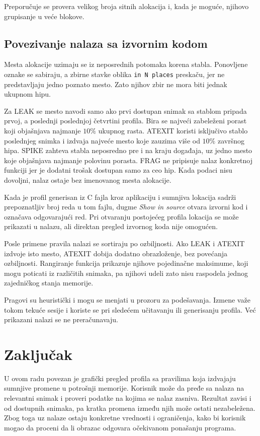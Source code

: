 \documentclass[a4paper,10pt]{article}
\begin{document}
Preporučuje se provera velikog broja sitnih alokacija i, kada je moguće,
njihovo grupisanje u veće blokove.

\subsection{Povezivanje nalaza sa izvornim kodom}

Mesta alokacije uzimaju se iz neposrednih potomaka korena stabla. Ponovljene
oznake se sabiraju, a zbirne stavke oblika \texttt{in N places} preskaču, jer ne
predstavljaju jedno poznato mesto. Zato njihov zbir ne mora biti jednak ukupnom
hipu.

Za LEAK se mesto navodi samo ako prvi dostupan snimak sa stablom pripada prvoj,
a poslednji poslednjoj četvrtini profila. Bira se najveći zabeleženi porast koji
objašnjava najmanje $10\%$ ukupnog rasta. ATEXIT koristi isključivo stablo
poslednjeg snimka i izdvaja najveće mesto koje zauzima više od $10\%$ završnog
hipa. SPIKE zahteva stabla neposredno pre i na kraju događaja, uz jedno mesto
koje objašnjava najmanje polovinu porasta. FRAG ne pripisuje nalaz konkretnoj
funkciji jer je dodatni trošak dostupan samo za ceo hip. Kada podaci nisu
dovoljni, nalaz ostaje bez imenovanog mesta alokacije.

Kada je profil generisan iz C fajla kroz aplikaciju i sumnjiva lokacija sadrži
prepoznatljiv broj reda u tom fajlu, dugme \textit{Show in source} otvara izvorni
kod i označava odgovarajući red. Pri otvaranju postojećeg profila lokacija se
može prikazati u nalazu, ali direktan pregled izvornog koda nije omogućen.

Posle primene pravila nalazi se sortiraju po ozbiljnosti. Ako LEAK i ATEXIT
izdvoje isto mesto, ATEXIT dobija dodatno obrazloženje, bez povećanja ozbiljnosti.
Rangiranje funkcija prikazuje njihove pojedinačne maksimume, koji mogu poticati
iz različitih snimaka, pa njihovi udeli zato nisu raspodela jednog zajedničkog
stanja memorije.

Pragovi su heuristički i mogu se menjati u prozoru za podešavanja. Izmene važe
tokom tekuće sesije i koriste se pri sledećem učitavanju ili generisanju profila.
Već prikazani nalazi se ne preračunavaju.

\section{Zaključak}

U ovom radu povezan je grafički pregled profila sa pravilima koja izdvajaju
sumnjive promene u potrošnji memorije. Korisnik može da pređe sa nalaza na
relevantni snimak i proveri podatke na kojima se nalaz zasniva.
Rezultat zavisi i od dostupnih snimaka, pa
kratka promena između njih može ostati nezabeležena. Zbog toga uz nalaze ostaju
konkretne vrednosti i ograničenja, kako bi korisnik mogao da proceni da li obrazac
odgovara očekivanom ponašanju programa.
\end{document}
